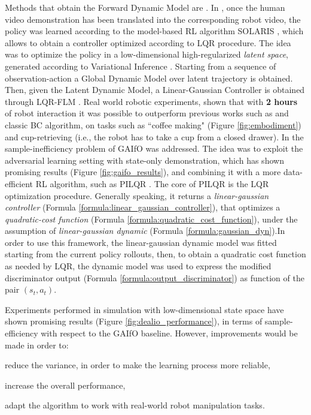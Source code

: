 
\newline Methods that obtain the Forward Dynamic Model are \cite{smith2019avid,torabi2021dealio}. In \cite{smith2019avid}, once the human video demonstration has been translated into the corresponding robot video, the policy was learned according to the model-based RL algorithm SOLARIS \cite{zhang2019solar}, which allows to obtain a controller optimized according to LQR procedure. The idea was to optimize the policy in a low-dimensional high-regularized \textit{latent space}, generated according to Variational Inference \cite{Kingma2014_vae}. Starting from a sequence of observation-action a Global Dynamic Model over latent trajectory is obtained. Then, given the Latent Dynamic Model, a Linear-Gaussian Controller is obtained through LQR-FLM \cite{levine2014lqr_flm}. Real world robotic experiments, shown that with \textbf{2 hours} of robot interaction it was possible to outperform previous works such as \cite{sermanet2018time_contrastive,torabi2018bco} and classic BC algorithm, on tasks such as ``coffee making" (Figure \ref{fig:embodiment}) and cup-retrieving (i.e., the robot has to take a cup from a closed drawer). 
In \cite{torabi2021dealio} the sample-inefficiency problem of GAIfO \cite{torabi2018gaifo} was addressed. The idea was to exploit the adversarial learning setting with state-only demonstration, which has shown promising results (Figure \ref{fig:gaifo_results}), and combining it with a more data-efficient RL algorithm, such as PILQR \cite{chebotar2017pilqr}. The core of PILQR is the LQR optimization procedure. Generally speaking, it returns a \textit{linear-gaussian controller} (Formula \ref{formula:linear_gaussian_controller}), that optimizes a \textit{quadratic-cost function} (Formula \ref{formula:quadratic_cost_function}), under the assumption of \textit{linear-gaussian dynamic} (Formula \ref{formula:gaussian_dyn}).\noindent In order to use this framework, the linear-gaussian dynamic model was fitted starting from the current policy rollouts, then, to obtain a quadratic cost function as needed by LQR, the dynamic model was used to express the modified discriminator output (Formula \ref{formula:output_discriminator}) as function of the pair $(s_{t},a_{t})$.

Experiments performed in simulation with low-dimensional state space have shown promising results (Figure \ref{fig:dealio_performance}), in terms of sample-efficiency with respect to the GAIfO baseline. However, improvements would be made in order to: \begin{enumerate*}[label=\textbf{(\arabic*)}]
    \item reduce the variance, in order to make the learning process more reliable,
    \item increase the overall performance,
    \item adapt the algorithm to work with real-world robot manipulation tasks.
\end{enumerate*}


